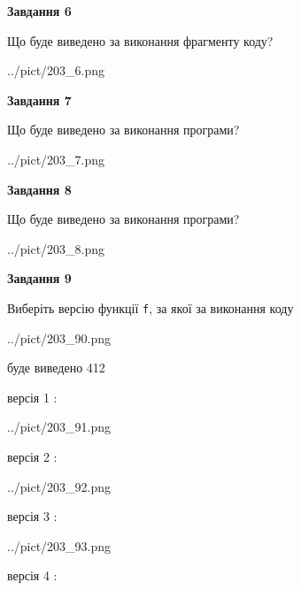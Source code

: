 \documentclass[12pt, ukrainian]{article}
\def\code#1{\Verb!#1!}
\begin{document}
{\begin {large}
{\begin {center}\textbf{Завдання 6}\end {center}}

Що буде виведено за виконання фрагменту коду?\par
\begin{center}
	{../pict/203_6.png}
\end{center}
\newpage

{\begin {center}\textbf{Завдання 7}\end {center}}

Що буде виведено за виконання програми?\par
\begin{center}
	{../pict/203_7.png}
\end{center}
\newpage

{\begin {center}\textbf{Завдання 8}\end {center}}

Що буде виведено за виконання програми?\par
\begin{center}
	{../pict/203_8.png}
\end{center}
\newpage

{\begin {center}\textbf{Завдання 9}\end {center}}

Виберіть версію функції \code{f}, за якої за виконання коду
\begin{center}
	{../pict/203_90.png}
\end{center}
буде виведено 412

\vspace{5mm}
версія 1 :

\begin{center}
	{../pict/203_91.png}
\end{center}
версія 2 :

\begin{center}
	{../pict/203_92.png}
\end{center}
версія 3 :

\begin{center}
	{../pict/203_93.png}
\end{center}
версія 4 :


\end{large}}
\end{document}
